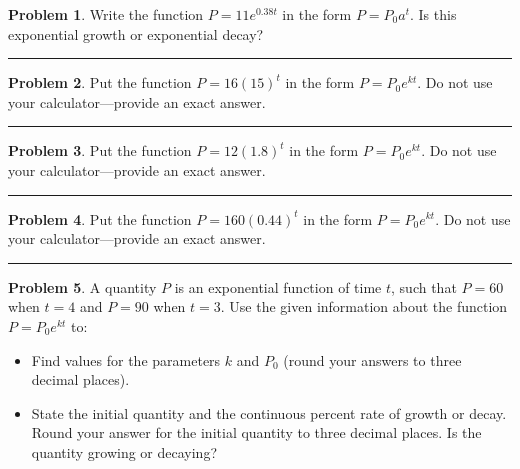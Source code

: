 \documentclass{amsart}
\theoremstyle{definition}
\newtheorem{problem}{Problem}
\begin{document}
\begin{problem}
Write the function $P=11 e^{0.38t}$ in the form $P=P_0 a^t$.  Is this exponential growth or exponential decay?
\end{problem}
\hrule

\begin{problem}
Put the function $P=16(15)^t$ in the form $P=P_0 e^{kt}$. Do not use your calculator---provide an exact answer.
\end{problem}
\hrule

\begin{problem}
Put the function $P=12(1.8)^t$ in the form $P=P_0 e^{kt}$. Do not use your calculator---provide an exact answer.
\end{problem}
\hrule

\begin{problem}
Put the function $P=160(0.44)^t$ in the form $P=P_0 e^{kt}$. Do not use your calculator---provide an exact answer.
\end{problem}
\hrule

\begin{problem}
A quantity $P$ is an exponential function of time $t$, such that $P=60$ when $t=4$ and $P=90$ when $t=3$.  Use the given information about the function $P=P_0 e^{kt}$ to:
\begin{itemize}
\item Find values for the parameters $k$ and $P_0$ (round your answers to three decimal places).
\item State the initial quantity and the continuous percent rate of growth or decay.  Round your answer for the initial quantity to three decimal places.  Is the quantity growing or decaying?
\end{itemize}
\end{problem}
\end{document}
